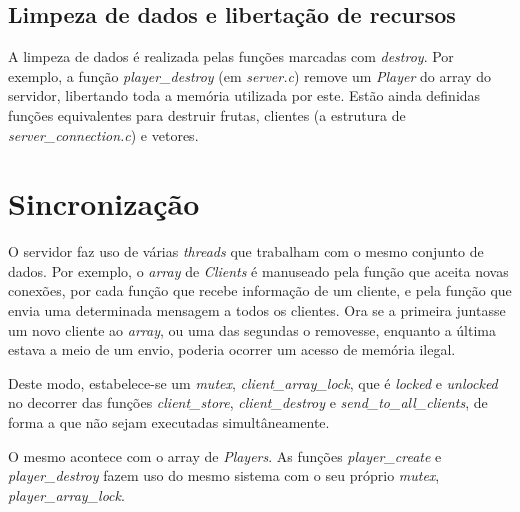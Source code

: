 \documentclass[a4paper]{report}
\begin{document}
        \subsection{Limpeza de dados e libertação de recursos}
            \par A limpeza de dados é realizada pelas funções marcadas com \textit{destroy}. Por exemplo, a função \textit{player\_destroy} (em \textit{server.c}) remove um \textit{Player} do array do servidor, libertando toda a memória utilizada por este. Estão ainda definidas funções equivalentes para destruir frutas, clientes (a estrutura de \textit{server\_connection.c}) e vetores.

    \section{Sincronização}
        \par O servidor faz uso de várias \textit{threads} que trabalham com o mesmo conjunto de dados. Por exemplo, o \textit{array} de \textit{Clients} é manuseado pela função que aceita novas conexões, por cada função que recebe informação de um cliente, e pela função que envia uma determinada mensagem a todos os clientes. Ora se a primeira juntasse um novo cliente ao \textit{array}, ou uma das segundas o removesse, enquanto a última estava a meio de um envio, poderia ocorrer um acesso de memória ilegal.
        \par Deste modo, estabelece-se um \textit{mutex}, \textit{client\_array\_lock}, que é \textit{locked} e \textit{unlocked} no decorrer das funções \textit{client\_store}, \textit{client\_destroy} e \textit{send\_to\_all\_clients}, de forma a que não sejam executadas simultâneamente.
        \par O mesmo acontece com o array de \textit{Players}. As funções \textit{player\_create} e \textit{player\_destroy} fazem uso do mesmo sistema com o seu próprio \textit{mutex}, \textit{player\_array\_lock}.
\end{document}
